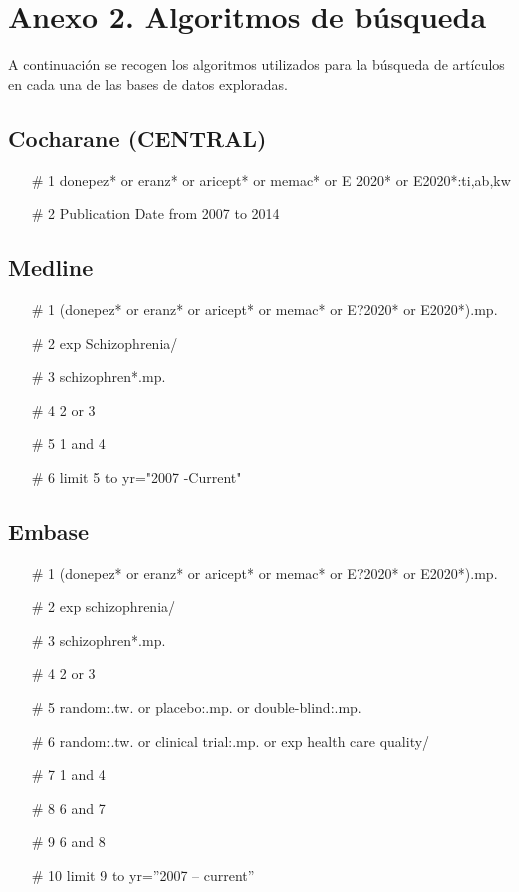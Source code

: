 \documentclass[a4paper,openright,12pt]{report}
\begin{document}
\chapter{Anexo 2. Algoritmos de búsqueda}\label{cap.algoritmos}
\begin{normalsize}
A continuación se recogen los algoritmos utilizados para la búsqueda de artículos en cada una de las bases de datos exploradas.
\section{Cocharane (CENTRAL)}
\begin{normalsize}
\begin{itemize}
\item[\# 1] donepez* or eranz* or aricept* or memac* or E 2020* or E2020*:ti,ab,kw        
\item[\# 2] Publication Date from 2007 to 2014
\end{itemize}
\end{normalsize}

\section{Medline}
\begin{itemize}
\item[\# 1] (donepez* or eranz* or aricept* or memac* or E?2020* or E2020*).mp. 
\item[\# 2] exp Schizophrenia/ 
\item[\# 3] schizophren*.mp. 
\item[\# 4] 2 or 3 
\item[\# 5] 1 and 4 
\item[\# 6] limit 5 to yr="2007 -Current" 
\end{itemize}
\end{normalsize}

\section{Embase}
\begin{normalsize}
\begin{itemize}
\item[\# 1] (donepez* or eranz* or aricept* or memac* or E?2020* or E2020*).mp. 
\item[\# 2] exp schizophrenia/ 
\item[\# 3] schizophren*.mp. 
\item[\# 4] 2 or 3 
\item[\# 5] random:.tw. or placebo:.mp. or double-blind:.mp.
\item[\# 6] random:.tw. or clinical trial:.mp. or exp health care quality/ 
\item[\# 7] 1 and 4
\item[\# 8] 6 and 7 
\item[\# 9] 6 and 8 
\item[\# 10] limit 9 to yr=”2007 – current”
\end{itemize}
\end{normalsize}
\end{document}
